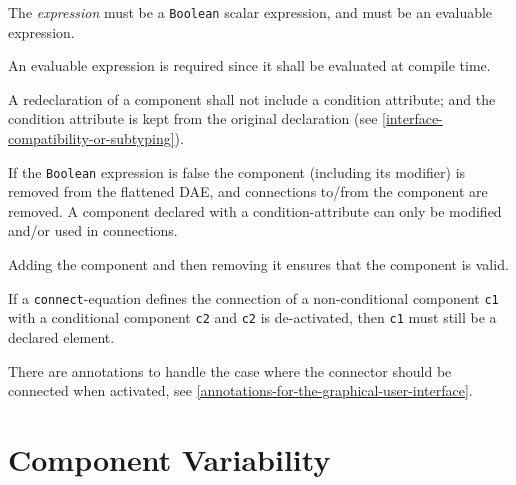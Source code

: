 The \emph{expression} must be a \lstinline!Boolean! scalar expression, and must be an evaluable expression.

\begin{nonnormative}
An evaluable expression is required since it shall be evaluated at compile time.
\end{nonnormative}

A redeclaration of a component shall not include a condition attribute;
and the condition attribute is kept from the original declaration (see
\cref{interface-compatibility-or-subtyping}).

If the \lstinline!Boolean! expression is false the component (including its modifier) is removed from the flattened DAE, and connections to/from the component are removed.
A component declared with a condition-attribute can only be modified and/or used in connections.

\begin{nonnormative}
Adding the component and then removing it ensures that the component is valid.

If a \lstinline!connect!-equation defines the connection of a non-conditional component \lstinline!c1! with a conditional component \lstinline!c2! and \lstinline!c2! is de-activated, then \lstinline!c1! must still be a declared element.

There are annotations to handle the case where the connector should be connected when activated, see \cref{annotations-for-the-graphical-user-interface}.
\end{nonnormative}


\section{Component Variability}\label{component-variability}

